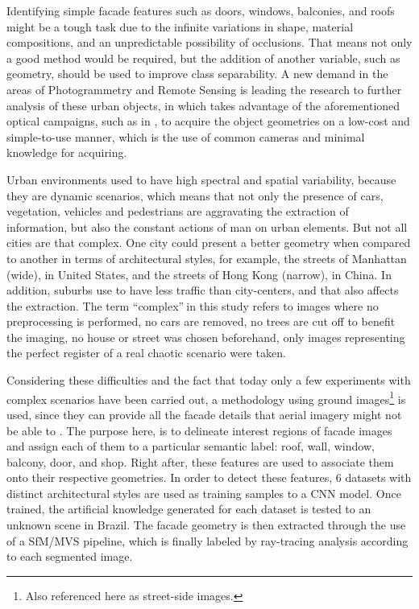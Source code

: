 Identifying simple facade features such as doors, windows, balconies, and roofs might be a tough task due to the infinite variations in shape, material compositions, and an unpredictable possibility of occlusions. That means not only a good method would be required, but the addition of another variable, such as geometry, should be used to improve class separability. A new demand in the areas of Photogrammetry and Remote Sensing is leading the research to further analysis of these urban objects, in which takes advantage of the aforementioned optical campaigns, such as in , to acquire the object geometries on a low-cost and simple-to-use manner, which is the use of common cameras and minimal knowledge for acquiring.

Urban environments used to have high spectral and spatial variability, because they are dynamic scenarios, which means that not only the presence of cars, vegetation, vehicles and pedestrians are aggravating the extraction of information, but also the constant actions of man on urban elements. But not all cities are that complex. One city could present a better geometry when compared to another in terms of architectural styles, for example, the streets of Manhattan (wide), in United States, and the streets of Hong Kong (narrow), in China. In addition, suburbs use to have less traffic than city-centers, and that also affects the extraction. The term \textquotedblleft complex\textquotedblright$~$in this study refers to images where no preprocessing is performed, no cars are removed, no trees are cut off to benefit the imaging, no house or street was chosen beforehand, only images representing the perfect register of a real chaotic scenario were taken.

Considering these difficulties and the fact that today only a few experiments with complex scenarios have been carried out, a methodology using ground images\footnote{Also referenced here as street-side images.} is used, since they can provide all the facade details that aerial imagery might not be able to \cite{musialski2013}. The purpose here, is to delineate interest regions of facade images and assign each of them to a particular semantic label: roof, wall, window, balcony, door, and shop. Right after, these features are used to associate them onto their respective geometries. In order to detect these features, 6 datasets with distinct architectural styles are used as training samples to a CNN model. Once trained, the artificial knowledge generated for each dataset is tested to an unknown scene in Brazil. The facade geometry is then extracted through the use of a SfM/MVS pipeline, which is finally labeled by ray-tracing analysis according to each segmented image.

